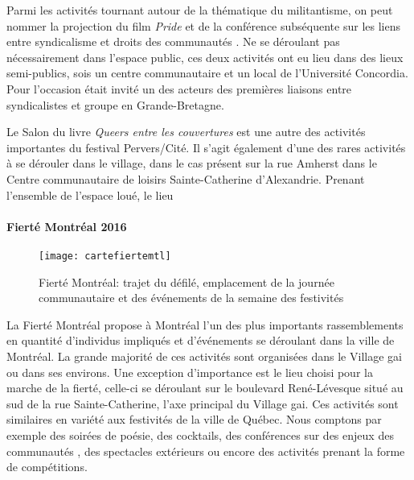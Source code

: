 Parmi les activités tournant autour de la thématique du militantisme, on peut nommer la projection du film \emph{Pride} et de la conférence subséquente sur les liens entre syndicalisme et droits des communautés \lgbt{}.
Ne se déroulant pas nécessairement dans l'espace public, ces deux activités ont eu lieu dans des lieux semi-publics, sois un centre communautaire et un local de l'Université Concordia.
Pour l'occasion était invité un des acteurs  des premières liaisons entre syndicalistes et groupe \lgbt{} en Grande-Bretagne.

Le Salon du livre \emph{Queers entre les couvertures} est une autre des activités importantes du festival Pervers/Cité.
Il s'agit également d'une des rares activités à se dérouler dans le village, dans le cas présent sur la rue Amherst dans le Centre communautaire de loisirs Sainte-Catherine d'Alexandrie.
Prenant l'ensemble de l'espace loué, le lieu

\paragraph{Fierté Montréal 2016}
\label{subsec:fiertemontreal2016}

\begin{figure}[h]
  \centering
  \texttt{[image: cartefiertemtl]}
  \caption[Fierté Montréal: trajet du défilé]{Fierté Montréal: trajet du défilé, emplacement de la journée communautaire et des événements de la semaine des festivités}\label{fig:cartefiertemtl}
\end{figure}

La Fierté Montréal propose à Montréal l'un des plus importants rassemblements \lgbt{} en quantité d'individus impliqués et d'événements se déroulant dans la ville de Montréal.
La grande majorité de ces activités sont organisées dans le Village gai ou dans ses environs.
Une exception d'importance est le lieu choisi pour la marche de la fierté, celle-ci se déroulant sur le boulevard René-Lévesque situé au sud de la rue Sainte-Catherine, l'axe principal du Village gai.
Ces activités sont similaires en variété aux festivités de la ville de Québec.
Nous comptons par exemple des soirées de poésie, des cocktails, des conférences sur des enjeux des communautés \lgbt, des spectacles extérieurs ou encore des activités prenant la forme de compétitions.


